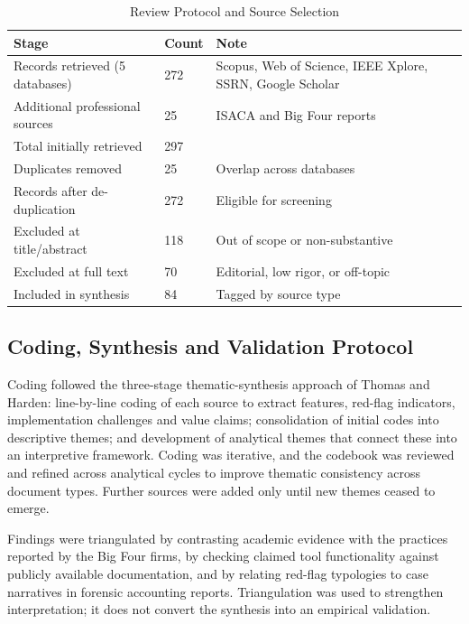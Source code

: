 \documentclass[conference]{IEEEtran}
\begin{document}
\begin{table}[!t]
\caption{Review Protocol and Source Selection}
\label{tab:protocol}
\centering
\footnotesize
\begin{tabular}{p{} p{} p{}}
\toprule
\textbf{Stage} & \textbf{Count} & \textbf{Note} \\
\midrule
Records retrieved (5 databases) & 272 & Scopus, Web of Science, IEEE Xplore, SSRN, Google Scholar \\
Additional professional sources & 25 & ISACA and Big Four reports \\
Total initially retrieved & 297 & \\
Duplicates removed & 25 & Overlap across databases \\
Records after de-duplication & 272 & Eligible for screening \\
Excluded at title/abstract & 118 & Out of scope or non-substantive \\
Excluded at full text & 70 & Editorial, low rigor, or off-topic \\
Included in synthesis & 84 & Tagged by source type \\
\bottomrule
\end{tabular}
\end{table}

\subsection{Coding, Synthesis and Validation Protocol}

Coding followed the three-stage thematic-synthesis approach of Thomas and Harden: line-by-line coding of each source to extract features, red-flag indicators, implementation challenges and value claims; consolidation of initial codes into descriptive themes; and development of analytical themes that connect these into an interpretive framework. Coding was iterative, and the codebook was reviewed and refined across analytical cycles to improve thematic consistency across document types. Further sources were added only until new themes ceased to emerge.

Findings were triangulated by contrasting academic evidence with the practices reported by the Big Four firms, by checking claimed tool functionality against publicly available documentation, and by relating red-flag typologies to case narratives in forensic accounting reports. Triangulation was used to strengthen interpretation; it does not convert the synthesis into an empirical validation.
\end{document}
